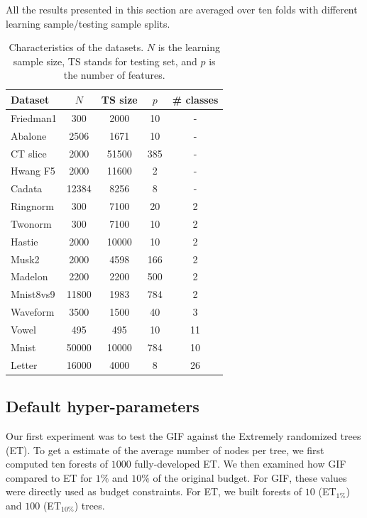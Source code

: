 \documentclass{article}
\begin{document}
All the results presented in this section are averaged over ten folds with 
different learning sample/testing sample splits.

\begin{table}[t]
\caption{Characteristics of the datasets. $N$ is the learning sample size, TS 
stands for testing set, and $p$ is the number of features.}
\label{tab:datasets}
\begin{center}
\begin{small}
\begin{sc}
\begin{tabular}{l|cccc}
\hline
Dataset & $N$ & TS size & $p$ & \# classes\\
\hline
Friedman1 & 300 & 2000 & 10 & - \\
Abalone & 2506 & 1671 & 10 & - \\
CT slice & 2000 & 51500 & 385 & - \\
Hwang F5 & 2000 & 11600 & 2 & - \\
Cadata & 12384 & 8256 & 8 & - \\
Ringnorm & 300 & 7100 & 20 & 2 \\
Twonorm & 300 & 7100 & 10 & 2 \\
Hastie & 2000 & 10000 & 10 & 2 \\
Musk2 & 2000 & 4598 & 166 & 2 \\
Madelon & 2200 & 2200 & 500 & 2 \\
Mnist8vs9 & 11800 & 1983 & 784 & 2 \\
Waveform & 3500 & 1500 & 40 & 3 \\
Vowel & 495 & 495 & 10 & 11 \\
Mnist & 50000 & 10000 & 784 & 10 \\
Letter & 16000 & 4000 & 8 & 26 \\
\hline
\end{tabular}
\end{sc}
\end{small}
\end{center}
\vskip -0.2in
\end{table}

\subsection{Default hyper-parameters}
\label{subsec:defaultHP}

Our first experiment was to test the GIF against the Extremely randomized trees 
(ET). To get a estimate of the average number of nodes per tree, we first 
computed ten forests of $1000$ fully-developed ET. We then examined how GIF 
compared to ET for $1\%$ and $10\%$ of the original budget. For GIF, these 
values were directly used as budget constraints. For ET, we built forests of 
$10$ (ET$_{1\%}$) and $100$ (ET$_{10\%}$) trees. 
\end{document}
